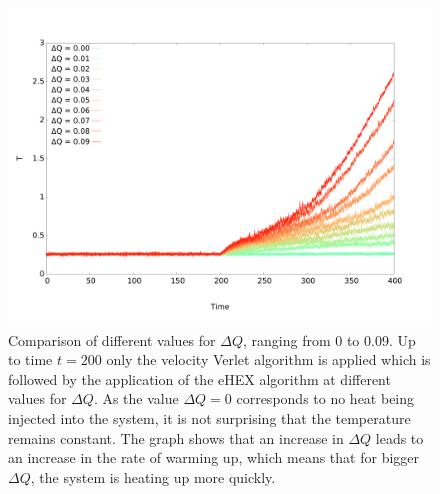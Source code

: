\documentclass[12pt]{article}
\begin{document}
\begin{figure}[h]
    \begin{center}
        \includegraphics[scale=0.4]{images/ehex_temp_dq.pdf}
        \caption{Comparison of different values for $\Delta Q$, ranging from 0 to 0.09. Up to time $t = 200$ only the velocity Verlet algorithm is
            applied which is followed by the application of the eHEX algorithm at different values for $\Delta Q$.
            As the value $\Delta Q=0$ corresponds to no heat being
        injected into the system, it is not surprising that the temperature remains constant. The graph shows that an increase in $\Delta Q$ leads to
    an increase in the rate of warming up, which means that for bigger $\Delta Q$, the system is heating up more quickly.}
        \label{fig:ehex_dq}
    \end{center}
\end{figure}
\end{document}
